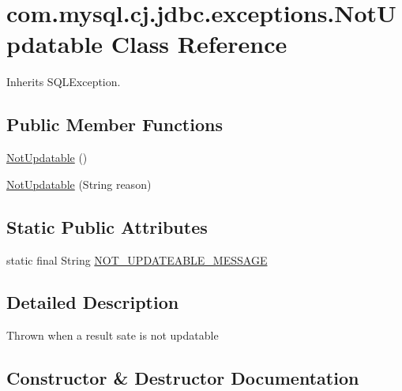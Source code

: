 \hypertarget{classcom_1_1mysql_1_1cj_1_1jdbc_1_1exceptions_1_1_not_updatable}{}\section{com.\+mysql.\+cj.\+jdbc.\+exceptions.\+Not\+Updatable Class Reference}
\label{classcom_1_1mysql_1_1cj_1_1jdbc_1_1exceptions_1_1_not_updatable}


Inherits S\+Q\+L\+Exception.

\subsection*{Public Member Functions}
\begin{DoxyCompactItemize}
\item 
\mbox{\hyperlink{classcom_1_1mysql_1_1cj_1_1jdbc_1_1exceptions_1_1_not_updatable_a198218085c3bf3f4f339f12fd134b69b}{Not\+Updatable}} ()
\item 
\mbox{\hyperlink{classcom_1_1mysql_1_1cj_1_1jdbc_1_1exceptions_1_1_not_updatable_a9a50d5a55f4f2cb875df2c5fcfb7e7cd}{Not\+Updatable}} (String reason)
\end{DoxyCompactItemize}
\subsection*{Static Public Attributes}
\begin{DoxyCompactItemize}
\item 
static final String \mbox{\hyperlink{classcom_1_1mysql_1_1cj_1_1jdbc_1_1exceptions_1_1_not_updatable_af1e8c6cf85e5f8967b93a32b16b7a837}{N\+O\+T\+\_\+\+U\+P\+D\+A\+T\+E\+A\+B\+L\+E\+\_\+\+M\+E\+S\+S\+A\+GE}}
\end{DoxyCompactItemize}


\subsection{Detailed Description}
Thrown when a result sate is not updatable 

\subsection{Constructor \& Destructor Documentation}
\mbox{\label{classcom_1_1mysql_1_1cj_1_1jdbc_1_1exceptions_1_1_not_updatable_a198218085c3bf3f4f339f12fd134b69b}} 
